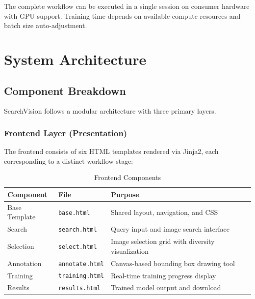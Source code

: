 \documentclass[12pt, letterpaper]{article}
\newcommand{\code}[1]{\texttt{\small\colorbox{codebg}{#1}}}
\begin{document}
The complete workflow can be executed in a single session on consumer hardware with GPU support. 
Training time depends on available compute resources and batch size auto-adjustment.

\section{System Architecture}

\subsection{Component Breakdown}

SearchVision follows a modular architecture with three primary layers.

\subsubsection{Frontend Layer (Presentation)}

The frontend consists of six HTML templates rendered via Jinja2, each corresponding to a
distinct workflow stage:

\begin{table}[H]
  \centering
  \caption{Frontend Components}
  \begin{tabularx}{\linewidth}{@{} l l X @{}}
    \toprule
    \textbf{Component} & \textbf{File}       & \textbf{Purpose} \\
    \midrule
    Base Template  & \code{base.html}     & Shared layout, navigation, and CSS \\
    Search         & \code{search.html}   & Query input and image search interface \\
    Selection      & \code{select.html}   & Image selection grid with diversity visualization \\
    Annotation     & \code{annotate.html} & Canvas-based bounding box drawing tool \\
    Training       & \code{training.html} & Real-time training progress display \\
    Results        & \code{results.html}  & Trained model output and download \\
    \bottomrule
  \end{tabularx}
\end{table}
\end{document}

